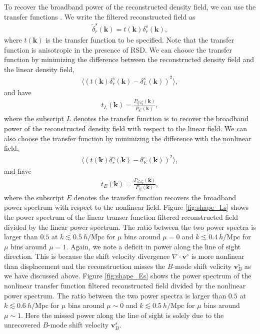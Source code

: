 \documentclass[aps,prx,twocolumn,superscriptaddress,groupedaddress,nofootinbib,amsfont]{revtex4}  %
\newcommand{\mr}{\mathrm}
\newcommand{\bea}{\begin{eqnarray}}
\newcommand{\eea}{\end{eqnarray}}
\newcommand{\bmv}{\bm{v}}
\newcommand{\bmk}{\bm{k}}
\newcommand{\la}{\langle}
\newcommand{\ra}{\rangle}
\begin{document}
To recover the broadband power of the reconstructed density field, we can use 
the transfer functions \cite{2017Marcel}. We write the filtered reconstructed
field as
\bea
\tilde{\delta}_{r}^s(\bmk)=t(\bmk)\delta_r^s(\bmk),
\eea
where $t(\bmk)$ is the transfer function to be specified. Note that the transfer
function is anisotropic in the presence of RSD. 
We can choose the transfer function by minimizing the difference between the 
reconstructed density field and the linear density field,
\bea
\la(t(\bmk){\delta}_r^s(\bmk)-\delta_L^s(\bmk))^2\ra,
\eea
and have 
\bea
t_L(\bmk)=\frac{P_{\delta_r^s\delta_L^s}(\bmk)}{P_{\delta_r^s}(\bmk)},
\eea
where the subscript $L$ denotes the transfer function is to recover the broadband power of the reconstructed density field with respect to the linear field. 
We can also choose the transfer function by minimizing the difference with the
nonlinear field,
\bea
\la(t(\bmk)\delta_r^s(\bmk)-\delta_E^s(\bmk))^2\ra,
\eea
and have 
\bea
t_E(\bmk)=\frac{P_{\delta_r^s\delta_E^s}(\bmk)}{P_{\delta_r^s}(\bmk)},
\eea
where the subscript $E$ denotes the transfer function recovers the broadband
power spectrum with respect to the nonlinear field.
Figure \ref{fig:shape_Ls} shows the power spectrum of the linear transer 
function filtered reconstructed field divided by the linear power spectrum.
The ratio between the two power spectra is larger than $0.5$ at $k\lesssim0.5\ h/\mr{Mpc}$ for $\mu$ bins around $\mu=0$ and $k\lesssim0.4\ h/\mr{Mpc}$ for
$\mu$ bins around $\mu=1$. Again, we note a deficit in power along the line of
sight direction. This is because the shift velocity divergence 
$\nabla\cdot\bmv^s$ is more nonlinear than displacement and the reconstruction
misses the $B$-mode shift velicity $\bmv^s_B$ as we have discussed above.
Figure \ref{fig:shape_Es} shows the power spectrum of the nonlinear transfer
function filtered reconstructed field divided by the nonlinear power spectrum.
The ratio between the two power spectra is larger than $0.5$ at $k\lesssim0.6\ h/\mr{Mpc}$ for $\mu$ bins around $\mu\sim0$ and $k\lesssim0.5\ h/\mr{Mpc}$ for
$\mu$ bins around $\mu\sim1$. Here the missed power along the line of sight is
solely due to the unrecovered $B$-mode shift velocity $\bmv^s_B$.
\end{document}
